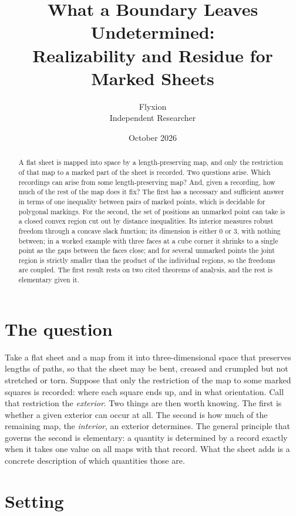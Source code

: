 \documentclass[11pt]{article}
\title{What a Boundary Leaves Undetermined:\\ Realizability and Residue for Marked Sheets}
\author{Flyxion\\ \small Independent Researcher}
\date{October 2026}
\theoremstyle{definition}
\theoremstyle{remark}
\begin{document}
\maketitle

\begin{abstract}
A flat sheet is mapped into space by a length-preserving map, and only the restriction of that map to a marked part of the sheet is recorded. Two questions arise. Which recordings can arise from some length-preserving map? And, given a recording, how much of the rest of the map does it fix? The first has a necessary and sufficient answer in terms of one inequality between pairs of marked points, which is decidable for polygonal markings. For the second, the set of positions an unmarked point can take is a closed convex region cut out by distance inequalities. Its interior measures robust freedom through a concave slack function; its dimension is either $0$ or $3$, with nothing between; in a worked example with three faces at a cube corner it shrinks to a single point as the gaps between the faces close; and for several unmarked points the joint region is strictly smaller than the product of the individual regions, so the freedoms are coupled. The first result rests on two cited theorems of analysis, and the rest is elementary given it.
\end{abstract}

\section{The question}

Take a flat sheet and a map from it into three-dimensional space that preserves lengths of paths, so that the sheet may be bent, creased and crumpled but not stretched or torn. Suppose that only the restriction of the map to some marked squares is recorded: where each square ends up, and in what orientation. Call that restriction the \emph{exterior}. Two things are then worth knowing. The first is whether a given exterior can occur at all. The second is how much of the remaining map, the \emph{interior}, an exterior determines. The general principle that governs the second is elementary: a quantity is determined by a record exactly when it takes one value on all maps with that record. What the sheet adds is a concrete description of which quantities those are.

\section{Setting}
\end{document}
